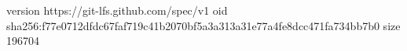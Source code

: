 version https://git-lfs.github.com/spec/v1
oid sha256:f77e0712dfdc67faf719c41b2070bf5a3a313a31e77a4fe8dcc471fa734bb7b0
size 196704
